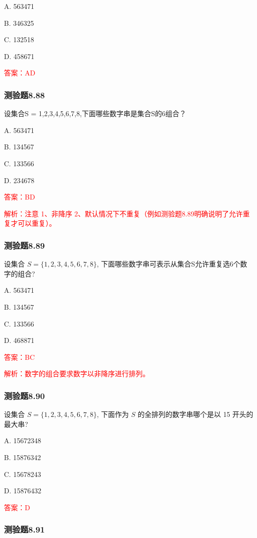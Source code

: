 \documentclass[UTF8, heading=true]{ctexart}
\begin{document}
A. 563471

B. 346325

C. 132518

D. 458671

\textcolor{red}{答案：AD}

\subsubsection{测验题8.88}

设集合S = {1,2,3,4,5,6,7,8},下面哪些数字串是集合S的6组合？

A. 563471

B. 134567

C. 133566

D. 234678

\textcolor{red}{答案：BD}

\textcolor{red}{解析：注意 1、非降序 2、默认情况下不重复（例如测验题8.89明确说明了允许重复才可以重复）。}

\subsubsection{测验题8.89}

设集合 $S=\{1,2,3,4,5,6,7,8\}$, 下面哪些数字串可表示从集合S允许重复选6个数字的组合?

A. 563471

B. 134567

C. 133566

D. 468871

\textcolor{red}{答案：BC}

\textcolor{red}{解析：数字的组合要求数字以非降序进行排列。}



\subsubsection{测验题8.90}

设集合 $S=\{1,2,3,4,5,6,7,8\}$, 下面作为 $S$ 的全排列的数字串哪个是以 15 开头的最大串?

A. 15672348

B. 15876342

C. 15678243

D. 15876432

\textcolor{red}{答案：D}

\subsubsection{测验题8.91}
\end{document}
